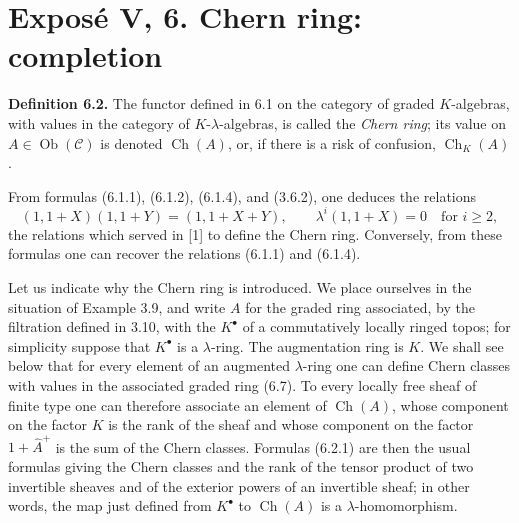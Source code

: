 \providecommand{\Ghat}{\widehat G}
\providecommand{\Aqhat}{\widehat A_{\mathbb Q}}
\providecommand{\Ch}{\operatorname{Ch}}
\providecommand{\Log}{\operatorname{Log}}
\providecommand{\id}{\operatorname{id}}
\providecommand{\gr}{\operatorname{gr}}
\providecommand{\Hom}{\operatorname{Hom}}
\providecommand{\epsi}{\varepsilon}
\providecommand{\clgr}{\operatorname{cl}}
\providecommand{\Fil}{\operatorname{Fil}}
\providecommand{\Gr}{\operatorname{Gr}}
\providecommand{\Sym}{\operatorname{Sym}}


\section*{Exposé V, 6. Chern ring: completion}

\textbf{Definition 6.2.} The functor defined in 6.1 on the category of graded \(K\)-algebras, with values in the category of \(K\)-\(\lambda\)-algebras, is called the \emph{Chern ring}; its value on \(A\in\operatorname{Ob}(\mathscr C)\) is denoted \(\Ch(A)\), or, if there is a risk of confusion, \(\Ch_K(A)\).

From formulas (6.1.1), (6.1.2), (6.1.4), and (3.6.2), one deduces the relations
\begin{equation}\tag{6.2.1}
 (1,1+X)(1,1+Y)=(1,1+X+Y),
 \qquad
 \lambda^i(1,1+X)=0\quad\text{for }i\ge2,
\end{equation}
the relations which served in [1] to define the Chern ring. Conversely, from these formulas one can recover the relations (6.1.1) and (6.1.4).

Let us indicate why the Chern ring is introduced. We place ourselves in the situation of Example 3.9, and write \(A\) for the graded ring associated, by the filtration defined in 3.10, with the \(K^\bullet\) of a commutatively locally ringed topos; for simplicity suppose that \(K^\bullet\) is a \(\lambda\)-ring. The augmentation ring is \(K\). We shall see below that for every element of an augmented \(\lambda\)-ring one can define Chern classes with values in the associated graded ring (6.7). To every locally free sheaf of finite type one can therefore associate an element of \(\Ch(A)\), whose component on the factor \(K\) is the rank of the sheaf and whose component on the factor \(1+\widehat A^+\) is the sum of the Chern classes. Formulas (6.2.1) are then the usual formulas giving the Chern classes and the rank of the tensor product of two invertible sheaves and of the exterior powers of an invertible sheaf; in other words, the map just defined from \(K^\bullet\) to \(\Ch(A)\) is a \(\lambda\)-homomorphism.

